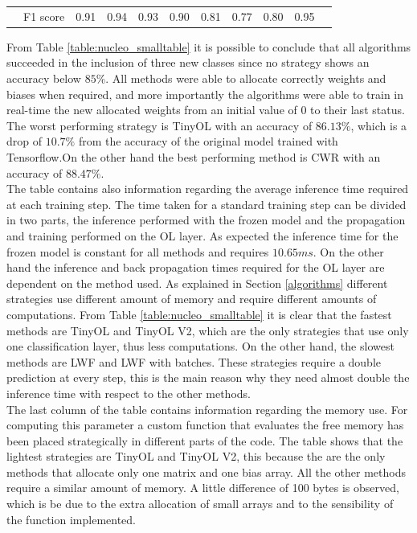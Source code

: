 \documentclass[12pt]{report}
\begin{document}
\begin{landscape}
\begin{table}[]
\begin{tabular}{cc|ccccccccc}
                                                                                  & F1 score                            & 0.91                            & 0.94                            & 0.93                            & 0.90                            & 0.81                            & 0.77                            & 0.80                            & 0.95                            &                                                                                  
\end{tabular}
\end{table}
\end{landscape}

From Table \ref{table:nucleo_smalltable} it is possible to conclude that all algorithms succeeded in the inclusion of three new classes since no strategy shows an accuracy below $85 \%$. All methods were able to allocate correctly weights and biases when required, and more importantly the algorithms were able to train in real-time the new allocated weights from an initial value of 0 to their last status. The worst performing strategy is TinyOL with an accuracy of $86.13 \%$, which is a drop of $10.7 \%$ from the accuracy of the original model trained with Tensorflow.On the other hand the best performing method is CWR with an accuracy of $88.47 \%$.\\
The table contains also information regarding the average inference time required at each training step. The time taken for a standard training step can be divided in two parts, the inference performed with the frozen model and the propagation and training performed on the OL layer. As expected the inference time for the frozen model is constant for all methods and requires $10.65 ms$. On the other hand the inference and back propagation times required for the OL layer are dependent on the method used. As explained in Section \ref{algorithms} different strategies use different amount of memory and require different amounts of computations. From Table \ref{table:nucleo_smalltable} it is clear that the fastest methods are TinyOL and TinyOL V2, which are the only strategies that use only one classification layer, thus less computations. On the other hand, the slowest methods are LWF and LWF with batches. These strategies require a double prediction at every step, this is the main reason why they need almost double the inference time with respect to the other methods. \\
The last column of the table contains information regarding the memory use. For computing this parameter a custom function that evaluates the free memory has been placed strategically in different parts of the code. The table shows that the lightest strategies are TinyOL and TinyOL V2, this because the are the only methods that allocate only one matrix and one bias array. All the other methods require a similar amount of memory. A little difference of 100 bytes is observed, which is be due to the extra allocation of small arrays and to the sensibility of the function implemented.\\
\end{document}
